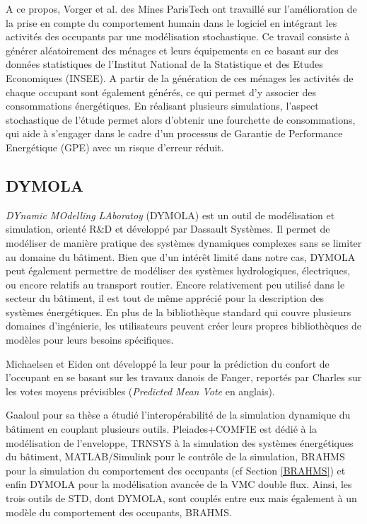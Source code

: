 A ce propos, Vorger et al. \cite{Vorger-14} des Mines ParisTech ont travaillé sur l'amélioration de la prise en compte du comportement humain dans le logiciel en intégrant les activités des occupants par une modélisation stochastique. Ce travail consiste à générer aléatoirement des ménages et leurs équipements en ce basant sur des données statistiques de l'Institut National de la Statistique et des Etudes Economiques (INSEE). A partir de la génération de ces ménages les activités de chaque occupant sont également générés, ce qui permet d'y associer des consommations énergétiques. En réalisant plusieurs simulations, l'aspect stochastique de l'étude permet alors d'obtenir une fourchette de consommations, qui aide à s'engager dans le cadre d'un processus de Garantie de Performance Energétique (GPE) avec un risque d'erreur réduit.

\subsection*{DYMOLA}

\textit{DYnamic MOdelling LAboratoy} (DYMOLA) est un outil de modélisation et simulation, orienté R\&D et développé par Dassault Systèmes. Il permet de modéliser de manière pratique des systèmes dynamiques complexes sans se limiter au domaine du bâtiment. Bien que d'un intérêt limité dans notre cas, DYMOLA peut également permettre de modéliser des systèmes hydrologiques, électriques, ou encore relatifs au transport routier. Encore relativement peu utilisé dans le secteur du bâtiment, il est tout de même apprécié pour la description des systèmes énergétiques. En plus de la bibliothèque standard qui couvre plusieurs domaines d'ingénierie, les utilisateurs peuvent créer leurs propres bibliothèques de modèles pour leurs besoins spécifiques. 

Michaelsen et Eiden \cite{Michaelsen-09} ont développé la leur pour la prédiction du confort de l'occupant en se basant sur les travaux danois de Fanger, reportés par Charles \cite{Charles-03} sur les votes moyens prévisibles (\textit{Predicted Mean Vote} en anglais).

Gaaloul \cite{Gaaloul-12} pour sa thèse a étudié l'interopérabilité de la simulation dynamique du bâtiment en couplant plusieurs outils. Pleiades+COMFIE est dédié à la modélisation de l'enveloppe, TRNSYS à la simulation des systèmes énergétiques du bâtiment, MATLAB/Simulink pour le contrôle de la simulation, BRAHMS pour la simulation du comportement des occupants (cf Section \ref{BRAHMS}) et enfin DYMOLA pour la modélisation avancée de la VMC double flux. Ainsi, les trois outils de STD, dont DYMOLA, sont couplés entre eux mais également à un modèle du comportement des occupants, BRAHMS.

